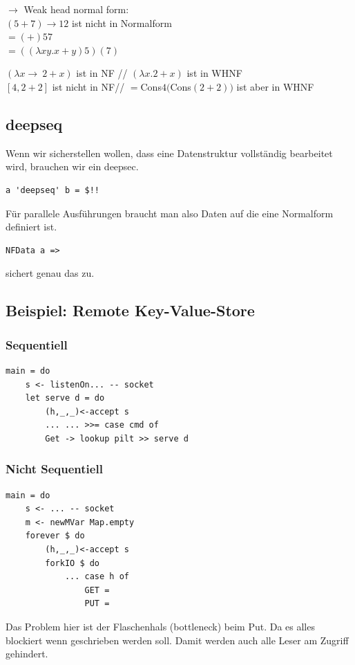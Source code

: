 \documentclass[ngerman,a4paper]{report}
\begin{document}
$\rightarrow$ Weak head normal form:\\
$(5+7) \rightarrow  12$ ist nicht in Normalform\\
$=(+) 5 7$\\
$=((\lambda xy.x+y)5) (7)$

$(\lambda x \rightarrow \ 2 + x )$ ist in NF //
$(\lambda x. 2 + x)$ ist in WHNF\\

$[4, 2+2]$ ist nicht in NF//
$= $Cons$4($Cons$(2+2))$ ist aber in WHNF\\

\subsection{deepseq}
Wenn wir sicherstellen wollen, dass eine Datenstruktur vollständig bearbeitet wird, brauchen wir ein deepsec.\\
\begin{lstlisting} 
a 'deepseq' b = $!!
\end{lstlisting}

Für parallele Ausführungen braucht man also Daten auf die eine Normalform definiert ist.
\begin{lstlisting} 
NFData a => 
\end{lstlisting}
sichert genau das zu.

\subsection{Beispiel: Remote Key-Value-Store}
\subsubsection{Sequentiell}
\begin{lstlisting}
main = do
	s <- listenOn... -- socket
	let serve d = do
		(h,_,_)<-accept s
		...	...	>>= case cmd of
		Get -> lookup pilt >> serve d
\end{lstlisting}

\subsubsection{Nicht Sequentiell}
\begin{lstlisting}
main = do
	s <- ... -- socket
	m <- newMVar Map.empty
	forever $ do
		(h,_,_)<-accept s
		forkIO $ do
			... case h of 
				GET = 
				PUT = 
\end{lstlisting}
Das Problem hier ist der Flaschenhals (bottleneck) beim Put. Da es alles blockiert wenn geschrieben werden soll. Damit werden auch alle Leser am Zugriff gehindert.\\ 
\end{document}
